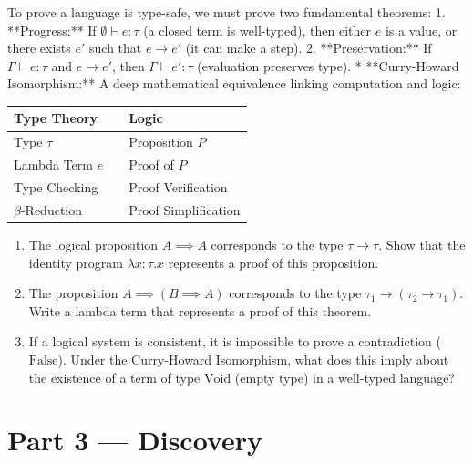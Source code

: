 \documentclass[12pt, a4paper]{book}
\begin{document}
\begin{explobox}
To prove a language is type-safe, we must prove two fundamental theorems:
1. **Progress:** If $\emptyset \vdash e : \tau$ (a closed term is well-typed), then either $e$ is a value, or there exists $e'$ such that $e \to e'$ (it can make a step).
2. **Preservation:** If $\Gamma \vdash e : \tau$ and $e \to e'$, then $\Gamma \vdash e' : \tau$ (evaluation preserves type).
* **Curry-Howard Isomorphism:** A deep mathematical equivalence linking computation and logic:
  \begin{center}
  \begin{tabular}{lcl}
    \toprule
    \textbf{Type Theory} & \qquad\qquad & \textbf{Logic} \\
    \midrule
    Type $\tau$ && Proposition $P$ \\
    Lambda Term $e$ && Proof of $P$ \\
    Type Checking && Proof Verification \\
    $\beta$-Reduction && Proof Simplification \\
    \bottomrule
  \end{tabular}
  \end{center}
\begin{enumerate}[label=(\alph*), leftmargin=*]
  \item The logical proposition $A \implies A$ corresponds to the type $\tau \to \tau$.
        Show that the identity program $\lambda x : \tau. x$ represents a proof of this proposition.
  \item The proposition $A \implies (B \implies A)$ corresponds to the type $\tau_1 \to (\tau_2 \to \tau_1)$.
        Write a lambda term that represents a proof of this theorem.
  \item If a logical system is consistent, it is impossible to prove a contradiction ($\text{False}$).
        Under the Curry-Howard Isomorphism, what does this imply about the existence of a term of type $\text{Void}$ (empty type) in a well-typed language?
\end{enumerate}
\end{explobox}

\newpage

\section{Part 3 --- Discovery}
\end{document}
